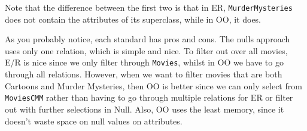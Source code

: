 \documentclass{article}
\begin{document}
    Note that the difference between the first two is that in ER, \texttt{MurderMysteries} does not contain the attributes of its superclass, while in OO, it does. 

    As you probably notice, each standard has pros and cons. The nulls approach uses only one relation, which is simple and nice. To filter out over all movies, E/R is nice since we only filter through \texttt{Movies}, whilst in OO we have to go through all relations. However, when we want to filter movies that are both Cartoons and Murder Mysteries, then OO is better since we can only select from \texttt{MoviesCMM} rather than having to go through multiple relations for ER or filter out with further selections in Null. Also, OO uses the least memory, since it doesn't waste space on null values on attributes.  
\end{document}
